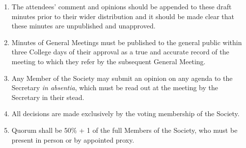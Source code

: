 \documentclass[a4paper]{tufte-handout}
\newcommand{\policyOffset}{12pt}
\newcommand{\policyBye}[2][\policyOffset]{\marginnote[#1]{\textsc{Bye-laws \S#2}}}
\begin{document}
\begin{enumerate}[resume]
    \item The attendees' comment and opinions should be appended to these draft minutes prior to their wider distribution and it should be made clear that these minutes are unpublished and unapproved.
    \item Minutes of General Meetings must be published to the general public within three College days of their approval as a true and accurate record of the meeting to which they refer by the subsequent General Meeting.
    \item Any Member of the Society may submit an opinion on any agenda to the Secretary \textit{in absentia}, which must be read out at the meeting by the Secretary in their stead.
    \item All decisions are made exclusively by the voting membership of the Society.
    \item \policyBye{B11} Quorum shall be 50\% + 1 of the full Members of the Society, who must be present in person or by appointed proxy.
\end{enumerate}
\end{document}
